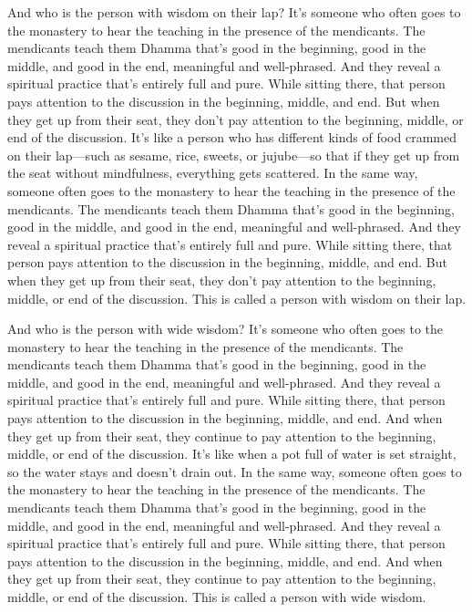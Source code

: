 \documentclass[12pt,openany]{book}%
\begin{document}
And who is the person with wisdom on their lap? It’s someone who often goes to the monastery to hear the teaching in the presence of the mendicants. The mendicants teach them Dhamma that’s good in the beginning, good in the middle, and good in the end, meaningful and well-phrased. And they reveal a spiritual practice that’s entirely full and pure. While sitting there, that person pays attention to the discussion in the beginning, middle, and end. But when they get up from their seat, they don’t pay attention to the beginning, middle, or end of the discussion. It’s like a person who has different kinds of food crammed on their lap—such as sesame, rice, sweets, or jujube—so that if they get up from the seat without mindfulness, everything gets scattered. In the same way, someone often goes to the monastery to hear the teaching in the presence of the mendicants. The mendicants teach them Dhamma that’s good in the beginning, good in the middle, and good in the end, meaningful and well-phrased. And they reveal a spiritual practice that’s entirely full and pure. While sitting there, that person pays attention to the discussion in the beginning, middle, and end. But when they get up from their seat, they don’t pay attention to the beginning, middle, or end of the discussion. This is called a person with wisdom on their lap. 

And who is the person with wide wisdom? It’s someone who often goes to the monastery to hear the teaching in the presence of the mendicants. The mendicants teach them Dhamma that’s good in the beginning, good in the middle, and good in the end, meaningful and well-phrased. And they reveal a spiritual practice that’s entirely full and pure. While sitting there, that person pays attention to the discussion in the beginning, middle, and end. And when they get up from their seat, they continue to pay attention to the beginning, middle, or end of the discussion. It’s like when a pot full of water is set straight, so the water stays and doesn’t drain out. In the same way, someone often goes to the monastery to hear the teaching in the presence of the mendicants. The mendicants teach them Dhamma that’s good in the beginning, good in the middle, and good in the end, meaningful and well-phrased. And they reveal a spiritual practice that’s entirely full and pure. While sitting there, that person pays attention to the discussion in the beginning, middle, and end. And when they get up from their seat, they continue to pay attention to the beginning, middle, or end of the discussion. This is called a person with wide wisdom. 
\end{document}
